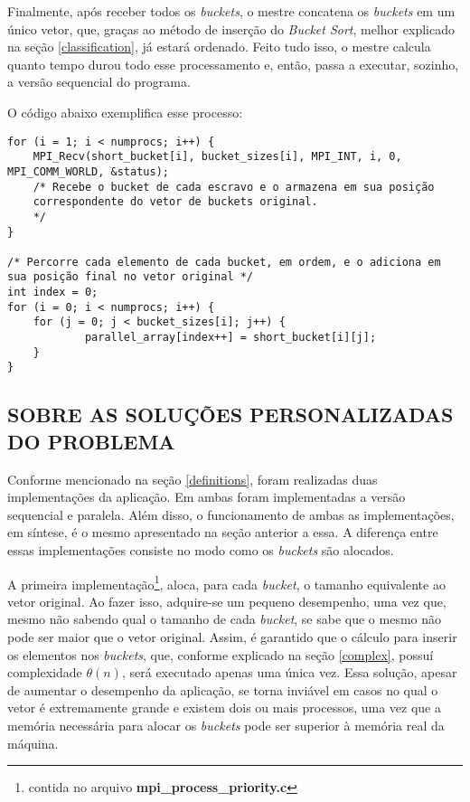 			Finalmente, após receber todos os \textit{buckets}, o mestre concatena os \textit{buckets} em um único vetor, que, graças ao método de inserção do \textit{Bucket Sort}, melhor explicado na seção \ref{classification}, já estará ordenado. Feito tudo isso, o mestre calcula quanto tempo durou todo esse processamento e, então, passa a executar, sozinho, a versão sequencial do programa.
			
			O código abaixo exemplifica esse processo:
			\begin{lstlisting}[style=C]
for (i = 1; i < numprocs; i++) {
	MPI_Recv(short_bucket[i], bucket_sizes[i], MPI_INT, i, 0, MPI_COMM_WORLD, &status);
	/* Recebe o bucket de cada escravo e o armazena em sua posição 
	correspondente do vetor de buckets original.
	*/
}

/* Percorre cada elemento de cada bucket, em ordem, e o adiciona em sua posição final no vetor original */
int index = 0;
for (i = 0; i < numprocs; i++) {
	for (j = 0; j < bucket_sizes[i]; j++) {
    		parallel_array[index++] = short_bucket[i][j];
	}
}
\end{lstlisting}

	\subsection{\normalsize SOBRE AS SOLUÇÕES PERSONALIZADAS DO PROBLEMA}\label{personal}
		Conforme mencionado na seção \ref{definitions}, foram realizadas duas implementações da aplicação. Em ambas foram implementadas a versão sequencial e paralela. Além disso, o funcionamento de ambas as implementações, em síntese, é o mesmo apresentado na seção anterior a essa. A diferença entre essas implementações consiste no modo como os \textit{buckets} são alocados.
		
		A primeira implementação\footnote{contida no arquivo \textbf{mpi\_process\_priority.c}}, aloca, para cada \textit{bucket}, o tamanho equivalente ao vetor original. Ao fazer isso, adquire-se um pequeno desempenho, uma vez que, mesmo não sabendo qual o tamanho de cada \textit{bucket}, se sabe que o mesmo não pode ser maior que o vetor original. Assim, é garantido que o cálculo para inserir os elementos nos \textit{buckets}, que, conforme explicado na seção \ref{complex}, possuí complexidade  $\theta(n)$, será executado apenas uma única vez. Essa solução, apesar de aumentar o desempenho da aplicação, se torna inviável em casos no qual o vetor é extremamente grande e existem dois ou mais processos, uma vez que a memória necessária para alocar os \textit{buckets} pode ser superior à memória real da máquina.
		
